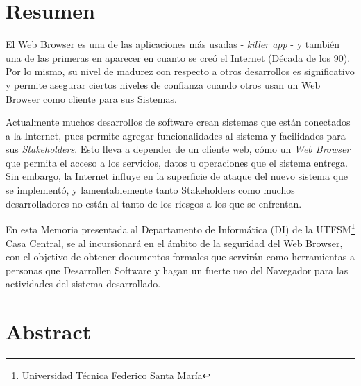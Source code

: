 
\section*{Resumen}
\label{chap:resumen}

El Web Browser es una de las aplicaciones más usadas - \textit{killer app} - y también una de las primeras en aparecer en cuanto se creó el Internet (Década de los 90). Por lo mismo, su nivel de madurez con respecto a otros desarrollos es significativo y permite asegurar ciertos niveles de confianza cuando otros usan un Web Browser como cliente para sus Sistemas. 

Actualmente muchos desarrollos de software crean sistemas que están conectados a la Internet, pues permite agregar funcionalidades al sistema y facilidades para sus \textit{Stakeholders}. Esto lleva a depender de un cliente web, cómo un \textit{Web Browser} que permita el acceso a los servicios, datos u operaciones que el sistema entrega. Sin embargo, la Internet influye en la superficie de ataque del nuevo sistema que se implementó, y lamentablemente tanto Stakeholders como muchos desarrolladores no están al tanto de los riesgos a los que se enfrentan.

En esta Memoria presentada al Departamento de Informática (DI) de la UTFSM\footnote{Universidad Técnica Federico Santa María} Casa Central, se al incursionará en el ámbito de la seguridad del Web Browser, con el objetivo de obtener documentos formales que servirán como herramientas a personas que Desarrollen Software y hagan un fuerte uso del Navegador para las actividades del sistema desarrollado.

\section*{Abstract}
\label{chap:abstract}


